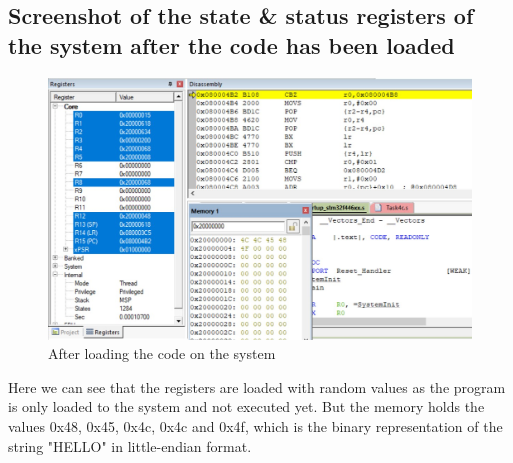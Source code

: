 \documentclass[footheight=20pt, footsepline, headheight=20pt, headsepline]{scrartcl}
\begin{document}
\subsection*{Screenshot of the state \& status registers of the system after the code has been loaded}
\begin{figure}[ht]
    \centering
    \includegraphics[scale=.7]{images/Task4c_Before1.jpg}
    \caption{After loading the code on the system}
    \label{fig:before_task_4c}
\end{figure}
\FloatBarrier
Here we can see that the registers are loaded with random values as the program is only loaded to the system and not executed yet. But the memory holds the values 0x48, 0x45, 0x4c, 0x4c and 0x4f, which is the binary representation of the string "HELLO" in little-endian format.
\end{document}
